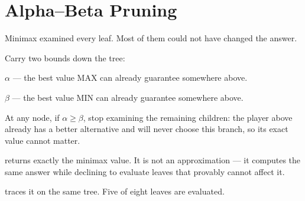 \section{Alpha--Beta Pruning}

Minimax examined every leaf. Most of them could not have changed the answer.

\begin{definitionbox}
Carry two bounds down the tree:
\begin{tight}
  \item $\alpha$ --- the best value MAX can already guarantee somewhere above.
  \item $\beta$ --- the best value MIN can already guarantee somewhere above.
\end{tight}
At any node, if $\alpha \ge \beta$, stop examining the remaining children: the
player above already has a better alternative and will never choose this branch, so
its exact value cannot matter.

 returns exactly the minimax value. It is not an
approximation --- it computes the same answer while declining to evaluate leaves
that provably cannot affect it.
\end{definitionbox}

 traces it on the same tree. Five of eight leaves are evaluated.

